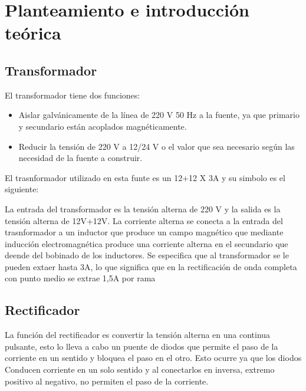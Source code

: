 \section{Planteamiento e introducción teórica} 
\subsection{Transformador}
\sangria{} El transformador tiene dos funciones:

\begin{itemize}
    \item Aislar galvánicamente de la línea de 220 V 50 Hz a la fuente, ya que
    primario y secundario están acoplados magnéticamente.
    \item Reducir la tensión de 220 V a 12/24 V o el valor que sea necesario según
    las necesidad de la fuente a construir.
\end{itemize}

\sangria{} El trasnformador  utilizado en esta funte es un 12+12 X 3A y su simbolo es el siguiente:


\sangria{} La entrada del transformador es la tensión alterna de 220 V y la salida es la tensión alterna de 12V+12V. La corriente alterna se conecta a la entrada del trasnformador a un inductor que produce un campo magnético que mediante inducción electromagnética produce una corriente alterna en el secundario que deende del bobinado de los inductores. 
\sangria{} Se especifica que al transformador se le pueden extaer hasta 3A, lo que significa que en la rectificación de onda completa con punto medio se extrae 1,5A por rama 

\subsection{Rectificador}
\sangria{} La función del rectificador es convertir la tensión alterna en una continua pulsante, esto lo lleva a cabo un puente de diodos que permite el paso de la corriente en un sentido y bloquea el paso en el otro. 
\sangria{} Esto ocurre ya que los diodos Conducen corriente en un solo sentido y al conectarlos en inversa, extremo positivo al negativo, no permiten el paso de la corriente.


